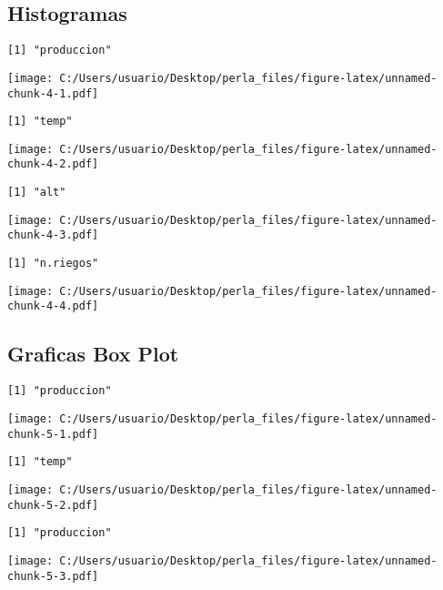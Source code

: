 \documentclass[]{article}
\begin{document}
\pagebreak

\subsection{Histogramas}\label{histogramas}

\begin{verbatim}
[1] "produccion"
\end{verbatim}

\texttt{[image: C:/Users/usuario/Desktop/perla\_files/figure-latex/unnamed-chunk-4-1.pdf]}

\begin{verbatim}
[1] "temp"
\end{verbatim}

\texttt{[image: C:/Users/usuario/Desktop/perla\_files/figure-latex/unnamed-chunk-4-2.pdf]}

\begin{verbatim}
[1] "alt"
\end{verbatim}

\texttt{[image: C:/Users/usuario/Desktop/perla\_files/figure-latex/unnamed-chunk-4-3.pdf]}

\begin{verbatim}
[1] "n.riegos"
\end{verbatim}

\texttt{[image: C:/Users/usuario/Desktop/perla\_files/figure-latex/unnamed-chunk-4-4.pdf]}

\subsection{Graficas Box Plot}\label{graficas-box-plot}

\begin{verbatim}
[1] "produccion"
\end{verbatim}

\texttt{[image: C:/Users/usuario/Desktop/perla\_files/figure-latex/unnamed-chunk-5-1.pdf]}

\begin{verbatim}
[1] "temp"
\end{verbatim}

\texttt{[image: C:/Users/usuario/Desktop/perla\_files/figure-latex/unnamed-chunk-5-2.pdf]}

\begin{verbatim}
[1] "produccion"
\end{verbatim}

\texttt{[image: C:/Users/usuario/Desktop/perla\_files/figure-latex/unnamed-chunk-5-3.pdf]}
\end{document}
